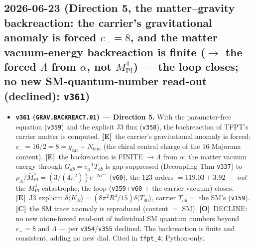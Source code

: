 \documentclass[11pt]{article}
\providecommand{\mE}{\textbf{[E]}}\providecommand{\mC}{\textbf{[C]}}
\providecommand{\mO}{\textbf{[O]}}\providecommand{\mX}{\textbf{[X]}}
\providecommand{\vref}[1]{\texttt{#1}}
\providecommand{\cthree}{c_3}\providecommand{\phiz}{\varphi_0^{\mathrm{ret}}}
\providecommand{\gcar}{g_{\mathrm{car}}}\providecommand{\Nfam}{N_{\mathrm{fam}}}
\providecommand{\Mbar}{\bar M_{\mathrm{Pl}}}\providecommand{\Z}{\mathbb{Z}}\providecommand{\PP}{\mathbb{P}}
\begin{document}
\subsection*{2026-06-23 (Direction 5, the matter--gravity backreaction: the carrier's gravitational anomaly is forced $c_-{=}8$, and the matter vacuum-energy backreaction is finite ($\to$ the forced $\Lambda$ from $\alpha$, not $M_{\mathrm{Pl}}^4$) --- the loop closes; no new SM-quantum-number read-out (declined): \texttt{v361})}
\begin{itemize}
\item \textbf{\texttt{v361} (\texttt{GRAV.BACKREACT.01}) --- Direction 5.} With the parameter-free equation (\vref{v359})
and the explicit J3 flux (\vref{v358}), the backreaction of TFPT's carrier matter is computed. \mE\ the carrier's
gravitational anomaly is forced: $c_-=16/2=8=\gcar{+}\Nfam$ (the chiral central charge of the $16$-Majorana content).
\mE\ the backreaction is FINITE $\to\Lambda$ from $\alpha$: the matter vacuum energy through $G_{ab}=\cthree^{-1}T_{ab}$
is gap-suppressed (Decoupling Thm \vref{v337}) to $\rho_\Lambda/\Mbar^4=(3/(4\pi^2))e^{-2\alpha^{-1}}$ (\vref{v60}),
the $123$ orders $=119.03+3.92$ --- \emph{not} the $M_{\mathrm{Pl}}^4$ catastrophe; the loop (\vref{v359}$+$\vref{v60}
$+$ the carrier vacuum) closes. \mE\ J3 explicit: $\delta\langle K_B\rangle=(8\pi^2R^4/15)\delta\langle T_{00}\rangle$,
carrier $T_{ab}=$ the SM's (\vref{v159}). \mC\ the SM trace anomaly is reproduced (content $=$ SM). \mO\ DECLINE: no
new atom-forced read-out of individual SM quantum numbers beyond $c_-{=}8$ and $\Lambda$ --- per \vref{v354}/\vref{v355}
declined. The backreaction is finite and consistent, adding no new dial. Cited in \texttt{tfpt\_4}; Python-only.
\end{itemize}
\end{document}
